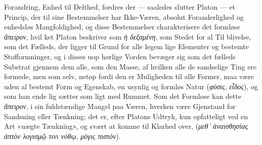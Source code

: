 \documentclass[12pt,a4paper]{book}
\newcommand{\gk}[1]{\textit{#1}}
\begin{document}
Forandring, Enhed til Delthed, fordres der --- saaledes slutter
Platon --- et Princip, der til sine Bestemmelser har Ikke-Væren,
absolut Foranderlighed og enhedsløs Mangfoldighed, og
disse Bestemmelser charakterisere det formløse \gk{ἄπειρον}, hvil\-%
ket Platon beskriver som \gk{ἡ δεξαμένη}, som Stedet for al Til\-%
blivelse, som det Fælleds, der ligger til Grund for alle legem\-%
lige Elementer og bestemte Stofformninger, og i disses uop\-%
hørlige Vorden bevæger sig som det fælleds Substrat gjennem
dem alle, som den Masse, af hvilken alle de sandselige Ting
ere formede, men som selv, netop fordi den er Muligheden til
alle Former, maa være uden al bestemt Form og Egenskab,
en usynlig og formløs Natur (\gk{φύσις}, \gk{εἶδος}), og som han ende\-%
lig sætter som ligt med Rummet. Som det Formløse kan
dette \gk{ἄπειρον}, i sin fuldstændige Mangel paa Væren, hverken
være Gjenstand for Sandsning eller Tænkning; det er, efter
Platons Udtryk, kun opfatteligt ved en Art «uægte Tænkning»,
og svært at komme til Klarhed over, (\gk{μεθ' ἀναισθησίας ἁπτὸν}
\gk{λογισμῷ τινι νόθῳ}, \gk{μὸγις πιστόν}).
\end{document}
